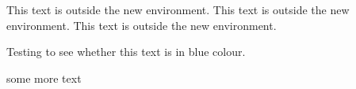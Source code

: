 \documentclass{article}
\newenvironment{bluetext} 
{\begin{center}\color{blue}} 
{\end{center}}
\begin{document}
 
This text is outside the new 
environment. This  text is 
outside the new environment. 
This  text is outside the new 
environment. 
\begin{bluetext} 
Testing to see whether this 
text is in blue colour. 
\end{bluetext} 
some more text 
\end{document}
